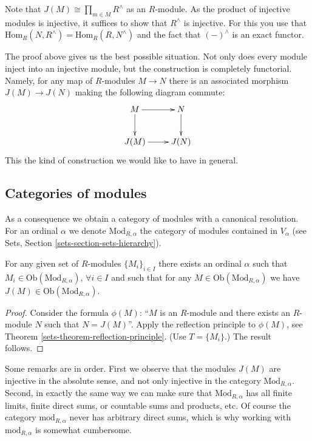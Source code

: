 \medskip\noindent
Note that $J(M) \cong \prod_{m\in M} R^\wedge$ as an $R$-module.
As the product of injective modules is injective, it suffices to
show that $R^\wedge$ is injective. For this you use that 
$\text{Hom}_R(N, R^\wedge) = \text{Hom}_R(R, N^\wedge)$ and the
fact that $(-)^\wedge$ is an exact functor.

\medskip\noindent
The proof above gives us the best possible situation. Not only does
every module inject into an injective module, but the construction is
completely functorial. Namely, for any map of $R$-modules $M \to N$ 
there is an associated morphism $J(M) \to J(N)$ making the following 
diagram commute:
$$
\xymatrix{
M \ar[d] \ar[r] & N \ar[d] \\
J(M) \ar[r] & J(N) }
$$
This the kind of construction we would like to have in general.

\subsection{Categories of modules}
\label{subsection-category-modules}

\noindent
As a consequence we obtain a category of modules with a canonical
resolution. For an ordinal $\alpha$ we denote $\text{Mod}_{R,\alpha}$
the category of modules contained in $V_\alpha$ (see Sets, 
Section \ref{sets-section-sets-hierarchy}).

\begin{lemma}
\label{lemma-injective-module-preserves-category}
For any given set of $R$-modules $\{M_i\}_{i\in I}$ there exists an ordinal
$\alpha$ such that $M_i \in \text{Ob}(\text{Mod}_{R,\alpha})$,
$\forall i\in I$ and such that for any
$M \in \text{Ob}(\text{Mod}_{R,\alpha})$ we have
$J(M) \in \text{Ob}(\text{Mod}_{R,\alpha})$.
\end{lemma}

\begin{proof}
Consider the formula $\phi(M)$: ``$M$ is an $R$-module and there exists
an $R$-module $N$ such that $N=J(M)$''. Apply the reflection principle to
$\phi(M)$, see  Theorem \ref{sets-theorem-reflection-principle}. (Use $T = 
\{M_i\}$.)
The result follows.
\end{proof}

\noindent
Some remarks are in order. First we observe that the modules $J(M)$
are injective in the absolute sense, and not only injective in the
category $\text{Mod}_{R,\alpha}$. Second, in exactly the same way we
can make sure that $\text{Mod}_{R,\alpha}$ has all finite limits,
finite direct sums, or countable sums and products, etc. Of course
the category $\text{mod}_{R,\alpha}$ never has arbitrary direct sums,
which is why working with $\text{mod}_{R,\alpha}$ is somewhat cumbersome.

